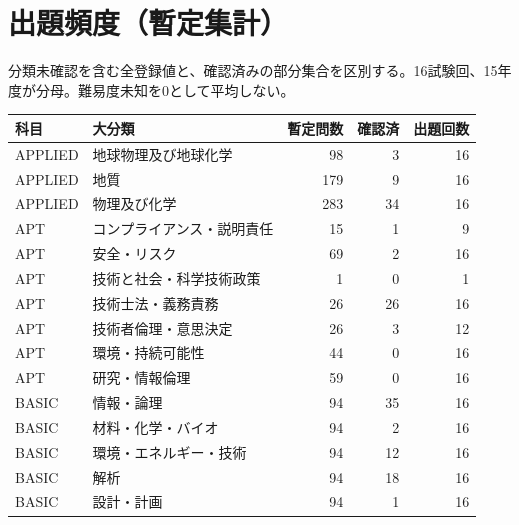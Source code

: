 \chapter{出題頻度（暫定集計）}
分類未確認を含む全登録値と、確認済みの部分集合を区別する。16試験回、15年度が分母。難易度未知を0として平均しない。
\begin{longtable}{p{.16\linewidth}p{.42\linewidth}rrr}
科目 & 大分類 & 暫定問数 & 確認済 & 出題回数\\\hline
APPLIED & 地球物理及び地球化学 & 98 & 3 & 16\\
APPLIED & 地質 & 179 & 9 & 16\\
APPLIED & 物理及び化学 & 283 & 34 & 16\\
APT & コンプライアンス・説明責任 & 15 & 1 & 9\\
APT & 安全・リスク & 69 & 2 & 16\\
APT & 技術と社会・科学技術政策 & 1 & 0 & 1\\
APT & 技術士法・義務責務 & 26 & 26 & 16\\
APT & 技術者倫理・意思決定 & 26 & 3 & 12\\
APT & 環境・持続可能性 & 44 & 0 & 16\\
APT & 研究・情報倫理 & 59 & 0 & 16\\
BASIC & 情報・論理 & 94 & 35 & 16\\
BASIC & 材料・化学・バイオ & 94 & 2 & 16\\
BASIC & 環境・エネルギー・技術 & 94 & 12 & 16\\
BASIC & 解析 & 94 & 18 & 16\\
BASIC & 設計・計画 & 94 & 1 & 16\\
\end{longtable}
